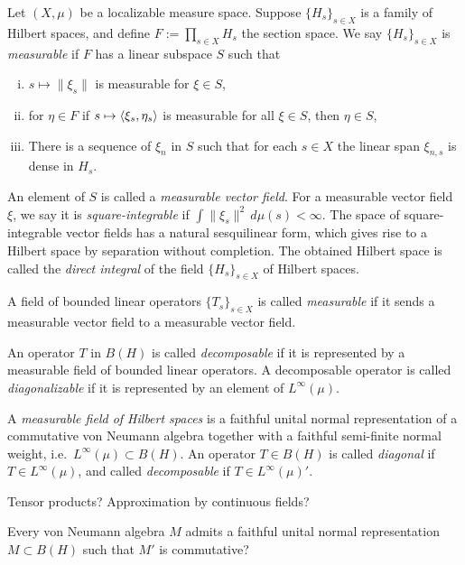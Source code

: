 \documentclass{../../large}
\begin{document}
\begin{prb}
Let $(X,\mu)$ be a localizable measure space.
Suppose $\{H_s\}_{s\in X}$ is a family of Hilbert spaces, and define $F:=\prod_{s\in X}H_s$ the section space.
We say $\{H_s\}_{s\in X}$ is \emph{measurable} if $F$ has a linear subspace $S$ such that
\begin{enumerate}[(i)]
\item $s\mapsto\|\xi_s\|$ is measurable for $\xi\in S$,
\item for $\eta\in F$ if $s\mapsto\langle\xi_s,\eta_s\rangle$ is measurable for all $\xi\in S$, then $\eta\in S$,
\item There is a sequence of $\xi_n$ in $S$ such that for each $s\in X$ the linear span $\xi_{n,s}$ is dense in $H_s$.
\end{enumerate}
An element of $S$ is called a \emph{measurable vector field}.
For a measurable vector field $\xi$, we say it is \emph{square-integrable} if $\int\|\xi_s\|^2\,d\mu(s)<\infty$.
The space of square-integrable vector fields has a natural sesquilinear form, which gives rise to a Hilbert space by separation without completion.
The obtained Hilbert space is called the \emph{direct integral} of the field $\{H_s\}_{s\in X}$ of Hilbert spaces.



A field of bounded linear operators $\{T_s\}_{s\in X}$ is called \emph{measurable} if it sends a measurable vector field to a measurable vector field.

An operator $T$ in $B(H)$ is called \emph{decomposable} if it is represented by a measurable field of bounded linear operators.
A decomposable operator is called \emph{diagonalizable} if it is represented by an element of $L^\infty(\mu)$.


\end{prb}


A \emph{measurable field of Hilbert spaces} is a faithful unital normal representation of a commutative von Neumann algebra together with a faithful semi-finite normal weight, i.e.~$L^\infty(\mu)\subset B(H)$.
An operator $T\in B(H)$ is called \emph{diagonal} if $T\in L^\infty(\mu)$, and called \emph{decomposable} if $T\in L^\infty(\mu)'$.

Tensor products?
Approximation by continuous fields?

Every von Neumann algebra $M$ admits a faithful unital normal representation $M\subset B(H)$ such that $M'$ is commutative?


\begin{prb}
\end{prb}
\end{document}
